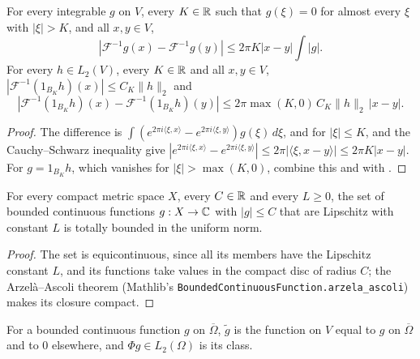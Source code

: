 \begin{theorem}
\label{thm:band-limited-lipschitz}
\leanok
{}
For every integrable $g$ on $V$, every $K \in \mathbb{R}$ such that $g(\xi) = 0$ for almost every $\xi$
with $|\xi| > K$, and all $x, y \in V$,
\[
  |\mathcal F^{-1} g(x) - \mathcal F^{-1} g(y)| \leq 2 \pi K |x - y| \int |g| .
\]
For every $h \in L_2(V)$, every $K \in \mathbb{R}$ and all $x, y \in V$,
$|\mathcal F^{-1}(1_{B_K} h)(x)| \leq C_K \|h\|_2$ and
\[
  |\mathcal F^{-1}(1_{B_K} h)(x) - \mathcal F^{-1}(1_{B_K} h)(y)|
  \leq 2 \pi \max(K, 0) \, C_K \|h\|_2 \, |x - y| .
\]
\end{theorem}

\begin{proof}
\leanok
The difference is $\int (e^{2 \pi i \langle \xi, x \rangle} - e^{2 \pi i \langle \xi, y \rangle})
g(\xi) \, d\xi$, and for $|\xi| \leq K$,  and the
Cauchy--Schwarz inequality give
$|e^{2 \pi i \langle \xi, x \rangle} - e^{2 \pi i \langle \xi, y \rangle}| \leq
2 \pi |\langle \xi, x - y \rangle| \leq 2 \pi K |x - y|$. For $g = 1_{B_K} h$, which vanishes for
$|\xi| > \max(K, 0)$, combine this and  with
.
\end{proof}

\begin{lemma}
\label{lem:lipschitz-totally-bounded}
\leanok
For every compact metric space $X$, every $C \in \mathbb{R}$ and every $L \geq 0$, the set of bounded
continuous functions $g : X \to \mathbb{C}$ with $|g| \leq C$ that are Lipschitz with constant $L$ is
totally bounded in the uniform norm.
\end{lemma}

\begin{proof}
\leanok
The set is equicontinuous, since all its members have the Lipschitz constant $L$, and its
functions take values in the compact disc of radius $C$; the Arzel\`a--Ascoli theorem (Mathlib's
\texttt{BoundedContinuousFunction.\allowbreak arzela\_\allowbreak ascoli}) makes its closure
compact.
\end{proof}

\begin{definition}
\label{def:closure-extension}
\leanok
For a bounded continuous function $g$ on $\overline \Omega$, $\tilde g$ is the function on $V$
equal to $g$ on $\overline \Omega$ and to $0$ elsewhere, and $\Phi g \in L_2(\Omega)$ is its
class.
\end{definition}

